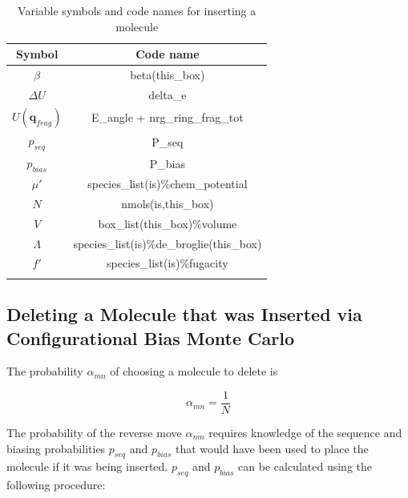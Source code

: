 \begin{table}
\caption{Variable symbols and code names for inserting a molecule}
\label{table:cbmcInsert}
\centering
\begin{tabular}{|c|c|} \hline
 {\bf Symbol} & {\bf Code name} \\ \hline
 $\beta$ & beta(this\_box) \\
 $\Delta U$ & delta\_e \\
 $U(\mathbf{q}_{frag})$ & E\_angle + nrg\_ring\_frag\_tot \\
 $p_{seq}$ & P\_seq \\
 $p_{bias}$ & P\_bias \\
 $\mu'$ & species\_list(is)\%chem\_potential \\
 $N$ & nmols(is,this\_box) \\
 $V$ & box\_list(this\_box)\%volume \\
 $\Lambda$ & species\_list(is)\%de\_broglie(this\_box) \\
 $f'$ & species\_list(is)\%fugacity \\
 \hline
\multicolumn{2}{c}{}
\end{tabular}
\end{table}

\subsection{Deleting a Molecule that was Inserted via \newline Configurational Bias Monte Carlo}
\label{sec:cbmcDelete}

The probability $\alpha_{mn}$ of choosing a molecule to delete is

\begin{equation}
\alpha_{mn} = \frac{1}{N}
\end{equation}

The probability of the reverse move $\alpha_{nm}$ requires knowledge of the sequence and biasing probabilities $p_{seq}$ and $p_{bias}$ that would have been used to place the molecule if it was being inserted. $p_{seq}$ and $p_{bias}$ can be calculated using the following procedure:

